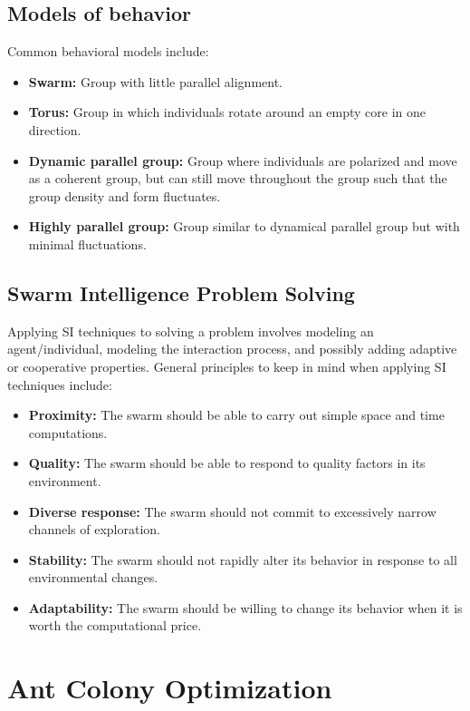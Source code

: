 \documentclass[12pt,titlepage]{article}
\begin{document}
    \subsection{Models of behavior}
      Common behavioral models include:
      \begin{itemize}
        \item \textbf{Swarm:} Group with little parallel alignment.
        \item \textbf{Torus:} Group in which individuals rotate around an empty core in one direction.
        \item \textbf{Dynamic parallel group:} Group where individuals are polarized and move as a coherent group, but can still move throughout the group
          such that the group density and form fluctuates.
        \item \textbf{Highly parallel group:} Group similar to dynamical parallel group but with minimal fluctuations.
      \end{itemize}

    \subsection{Swarm Intelligence Problem Solving}
      Applying SI techniques to solving a problem involves modeling an agent/individual, modeling the interaction process, and possibly adding
      adaptive or cooperative properties. General principles to keep in mind when applying SI techniques include:
      \begin{itemize}
        \item \textbf{Proximity:} The swarm should be able to carry out simple space and time computations.
        \item \textbf{Quality:} The swarm should be able to respond to quality factors in its environment.
        \item \textbf{Diverse response:} The swarm should not commit to excessively narrow channels of exploration.
        \item \textbf{Stability:} The swarm should not rapidly alter its behavior in response to all environmental changes.
        \item \textbf{Adaptability:} The swarm should be willing to change its behavior when it is worth the computational price.
      \end{itemize}

  \newpage

  \section{Ant Colony Optimization}
\end{document}
